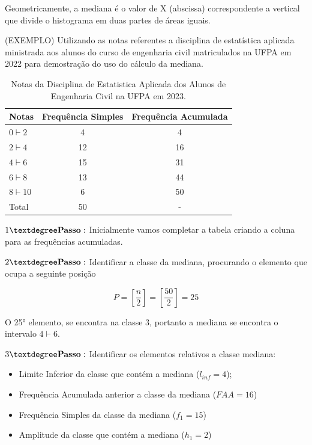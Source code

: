 Geometricamente, a mediana é o valor de X (abscissa) correspondente a vertical que divide o histograma em duas partes de áreas iguais.\vskip0.3cm

\newpage
(EXEMPLO) Utilizando as notas referentes a disciplina de estatística aplicada ministrada aos alunos do curso de engenharia civil matriculados na UFPA em 2022 para demostração do uso do cálculo da mediana.

  \begin{table}[!htb]
    \centering
    {
    \caption{Notas da Disciplina de Estatistica Aplicada dos Alunos de En\-ge\-nha\-ri\-a Civil na UFPA em 2023.}
    \label{exemplomediana}
    \vspace{0.1cm}
\begin{tabular}{l|c|c}
  \hline\hline
  Notas          & Frequência Simples & Frequência Acumulada \\
  \hline\hline
  $0 \vdash 2  $ & 4          & 4                    \\
  $2 \vdash 4  $ & 12         & 16                   \\
  $4 \vdash 6  $ & 15         & 31                   \\
  $6 \vdash 8  $ & 13         & 44                   \\
  $8 \vdash 10 $ & 6          & 50                   \\
  \hline\hline
  Total & 50                  &  - \\
    \hline\hline
\end{tabular}}
\end{table}

$1° \mbox{\textbf{Passo}}:$ Inicialmente vamos completar a tabela criando a coluna para as frequências acumuladas.\vskip0.3cm

$2° \mbox{\textbf{Passo}}:$ Identificar a classe da mediana, procurando o elemento que ocupa a seguinte posição

$$ P= \left[ \frac{n}{2} \right] = \left[ \frac{50}{2} \right] = 25 $$

O 25° elemento, se encontra na classe 3, portanto a mediana se encontra o intervalo $ 4 \vdash 6$.

\vskip0.3cm

$3° \mbox{\textbf{Passo}}:$ Identificar os elementos relativos a classe mediana:

\begin{itemize}
  \item Limite Inferior da classe que contém a mediana ($l_{inf}=4$);
  \item Frequência Acumulada anterior a classe da mediana ($FAA=16$)
  \item Frequência Simples da classe da mediana ($f_{1}=15$)
  \item Amplitude da classe que contém a mediana ($h_{1}=2$)
\end{itemize}

